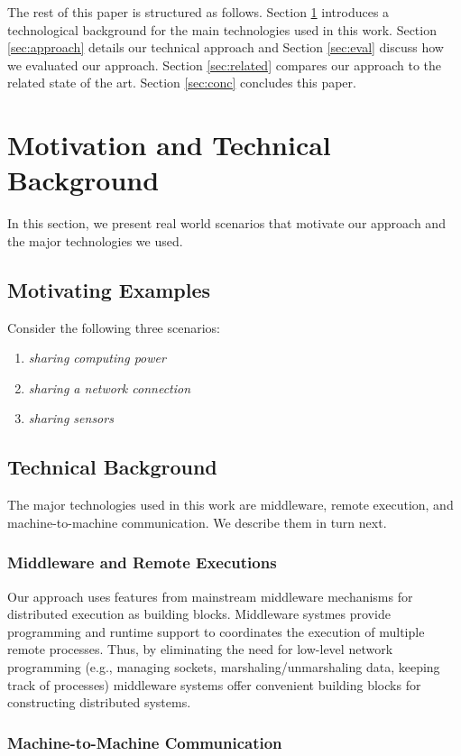 \documentclass[conference]{IEEEtran}
\begin{document}
The rest of this paper is structured as follows. Section \ref{sec:background} introduces a technological background for the main technologies used in this work. Section \ref{sec:approach} details our technical approach and Section \ref{sec:eval} discuss how we evaluated our approach. Section \ref{sec:related} compares our approach to the related state of the art. Section \ref{sec:conc} concludes this paper.
 
\section{Motivation and Technical Background}
\label{sec:background}
In this section, we present real world scenarios that motivate our approach and the major technologies we used.

\subsection{Motivating Examples}
Consider the following three scenarios:
\begin{enumerate}
\item \emph{sharing computing power} 
\item \emph{sharing a network connection}
\item \emph{sharing sensors}
\end{enumerate}

\subsection{Technical Background}
The major technologies used in this work are middleware, remote execution, and machine-to-machine communication. We describe them in turn next.

\subsubsection{Middleware and Remote Executions}
Our approach uses features from mainstream middleware mechanisms for distributed execution as building blocks. Middleware systmes provide programming and runtime support to coordinates the execution of multiple remote processes. 
Thus, by eliminating the need for low-level network programming (e.g., managing sockets, marshaling/unmarshaling data, keeping track of processes) middleware systems offer convenient building blocks for constructing distributed systems. 

\subsubsection{Machine-to-Machine Communication}
\end{document}
